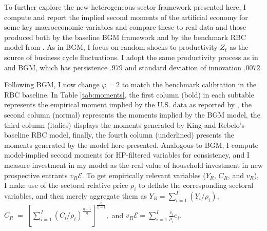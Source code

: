 \documentclass[a4paper,12pt]{article} %
\numberwithin{equation}{section} %
\numberwithin{figure}{section}
\numberwithin{table}{section}
\begin{document}
To further explore the new heterogeneous-sector framework presented here, I compute and report the implied second
moments of the artificial economy for some key macroeconomic variables and compare these to real data and those produced
both by the baseline BGM framework and by the benchmark RBC model from \textcite{king1999resuscitating}. As in BGM,
I focus on random shocks to productivity $Z_t$ as the source of business cycle fluctuations. I adopt the same
productivity process as in \textcite{king1999resuscitating} and BGM, which has persistence $.979$ and standard deviation
of innovation $.0072$.

Following BGM, I now change $\varphi = 2$ to match the benchmark calibration in
the RBC baseline. In Table \ref{tab:moments}, the first column (bold) in each subtable represents the empirical
moment implied by the U.S. data as reported by \textcite{king1999resuscitating}, the second column (normal) 
represents the moments implied by the BGM model, the third column (italics) displays the moments
generated by King and Rebelo’s baseline RBC model, finally, the fourth column (underlined) presents the moments
generated by the model here presented. Analogous to BGM, I compute model-implied second moments for HP-filtered 
variables for consistency, and I measure investment in my model 
as the real value of household investment in new prospective entrants $v_R \mathcal{E}$. To get empirically relevant
variables ($Y_R$, $C_R$, and $v_R$), I make use of the sectoral relative price $\rho_i$ to deflate the corresponding sectoral variables,
and then merely aggregate them as $Y_R = \sum_{i=1}^I(Y_i/\rho_i)$, $C_R\;=\; 
\left[ \sum_{i=1}^I \left( C_{i}/\rho_i \right)^{\frac{\eta-1}{\eta}} \right]^{\frac{\eta}{\eta-1}},$ 
and $v_R\mathcal{E}=\sum_{i=1}^I\frac{v_{i}}{\rho_i}e_{i}$. 
\end{document}
